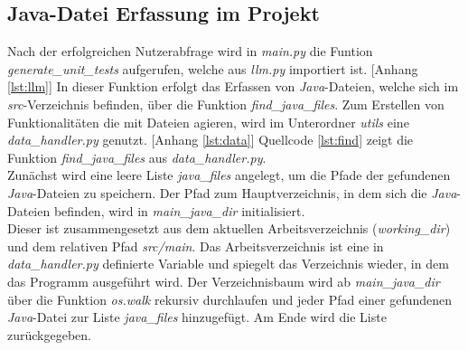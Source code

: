 \subsection{Java-Datei Erfassung im Projekt}
Nach der erfolgreichen Nutzerabfrage wird in \textit{main.py} die Funtion \textit{generate\_unit\_tests} aufgerufen, welche aus \textit{llm.py} importiert ist. [Anhang \ref{lst:llm}] In dieser Funktion erfolgt das Erfassen von \textit{Java}-Dateien, welche sich im \textit{src}-Verzeichnis befinden, über die Funktion \textit{find\_java\_files}. Zum Erstellen von Funktionalitäten die mit Dateien agieren, wird im Unterordner \textit{utils} eine \textit{data\_handler.py} genutzt. [Anhang \ref{lst:data}] Quellcode \ref{lst:find} zeigt die Funktion \textit{find\_java\_files} aus \textit{data\_handler.py}.\\ Zunächst wird eine leere Liste \textit{java\_files} angelegt, um die Pfade der gefundenen \textit{Java}-Dateien zu speichern. Der Pfad zum Hauptverzeichnis, in dem sich die \textit{Java}-Dateien befinden, wird in \textit{main\_java\_dir} initialisiert. \\
\vspace{-.3cm}
Dieser ist zusammengesetzt aus dem aktuellen Arbeitsverzeichnis (\textit{working\_dir}) und dem relativen Pfad \textit{src/main}. Das Arbeitsverzeichnis ist eine in \textit{data\_handler.py} definierte Variable und spiegelt das Verzeichnis wieder, in dem das Programm ausgeführt wird. Der Verzeichnisbaum wird ab \textit{main\_java\_dir} über die Funktion \textit{os.walk} rekursiv durchlaufen und jeder Pfad einer gefundenen \textit{Java}-Datei zur Liste \textit{java\_files} hinzugefügt. Am Ende wird die Liste zurückgegeben. 

